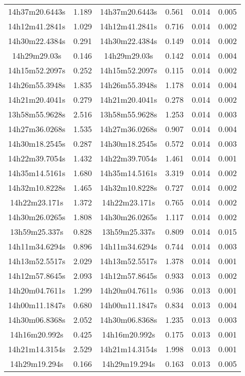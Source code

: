 \begin{table}
\begin{tabular}{cccccc}
14h37m20.6443s & 1.189 & 14h37m20.6443s & 0.561 & 0.014 & 0.005 \\
14h12m41.2841s & 1.029 & 14h12m41.2841s & 0.716 & 0.014 & 0.002 \\
14h30m22.4384s & 0.291 & 14h30m22.4384s & 0.149 & 0.014 & 0.002 \\
14h29m29.03s & 0.146 & 14h29m29.03s & 0.142 & 0.014 & 0.004 \\
14h15m52.2097s & 0.252 & 14h15m52.2097s & 0.115 & 0.014 & 0.002 \\
14h26m55.3948s & 1.835 & 14h26m55.3948s & 1.178 & 0.014 & 0.004 \\
14h21m20.4041s & 0.279 & 14h21m20.4041s & 0.278 & 0.014 & 0.002 \\
13h58m55.9628s & 2.516 & 13h58m55.9628s & 1.253 & 0.014 & 0.003 \\
14h27m36.0268s & 1.535 & 14h27m36.0268s & 0.907 & 0.014 & 0.004 \\
14h30m18.2545s & 0.287 & 14h30m18.2545s & 0.572 & 0.014 & 0.003 \\
14h22m39.7054s & 1.432 & 14h22m39.7054s & 1.461 & 0.014 & 0.001 \\
14h35m14.5161s & 1.680 & 14h35m14.5161s & 3.319 & 0.014 & 0.002 \\
14h32m10.8228s & 1.465 & 14h32m10.8228s & 0.727 & 0.014 & 0.002 \\
14h22m23.171s & 1.372 & 14h22m23.171s & 0.765 & 0.014 & 0.002 \\
14h30m26.0265s & 1.808 & 14h30m26.0265s & 1.117 & 0.014 & 0.002 \\
13h59m25.337s & 0.828 & 13h59m25.337s & 0.809 & 0.014 & 0.015 \\
14h11m34.6294s & 0.896 & 14h11m34.6294s & 0.744 & 0.014 & 0.003 \\
14h13m52.5517s & 2.029 & 14h13m52.5517s & 1.378 & 0.014 & 0.001 \\
14h12m57.8645s & 2.093 & 14h12m57.8645s & 0.933 & 0.013 & 0.002 \\
14h20m04.7611s & 1.299 & 14h20m04.7611s & 0.936 & 0.013 & 0.001 \\
14h00m11.1847s & 0.680 & 14h00m11.1847s & 0.834 & 0.013 & 0.004 \\
14h30m06.8368s & 2.052 & 14h30m06.8368s & 1.235 & 0.013 & 0.003 \\
14h16m20.992s & 0.425 & 14h16m20.992s & 0.175 & 0.013 & 0.001 \\
14h21m14.3154s & 2.529 & 14h21m14.3154s & 1.998 & 0.013 & 0.001 \\
14h29m19.294s & 0.166 & 14h29m19.294s & 0.163 & 0.013 & 0.005 \\

\end{tabular}
\end{table}

